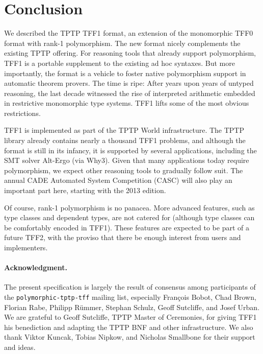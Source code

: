 \section{Conclusion}
\label{sec_concl}

We described the TPTP TFF1 format, an extension of the monomorphic TFF0 format
with rank-1 polymorphism. The new format nicely complements the existing TPTP
offering. %
For reasoning tools that already
support polymorphism, TFF1 is a portable supplement to the existing ad hoc
syntaxes. But more importantly, the format is a vehicle to foster native
polymorphism support in automatic theorem provers. The time is ripe: After years
upon years of untyped reasoning, the last decade witnessed the rise of
interpreted arithmetic embedded in restrictive monomorphic type systems. TFF1
lifts some of the most obvious restrictions.

TFF1 is implemented as part of the TPTP World infrastructure. The TPTP library
already contains nearly a thousand TFF1 problems, and although the format is
still in its infancy, it is supported by several applications, including the SMT
solver Alt-Ergo (via Why3). Given that many applications today require
polymorphism, we expect other reasoning tools to gradually follow suit. The
annual CADE Automated System Competition (CASC) will also play an important
part here, starting with the 2013 edition.

Of course, rank-1 polymorphism is no panacea. More advanced features, such as
type classes and dependent types, are not catered for (although type
classes can be comfortably encoded in TFF1). These features are expected to be
part of a future TFF2, with the proviso that there be enough interest from users
and implementers.

\def\ackname{Acknowledgment}
\paragraph{\textbf{\upshape\ackname.}}
%
The present specification is largely the result of consensus among
participants of the {\tt polymorphic-tptp-tff} mailing list, especially
Fran\c{c}ois Bobot, Chad Brown, Florian Rabe, Philipp R\"ummer, Stephan Schulz,
Geoff Sutcliffe, and Josef Urban.
We are grateful to Geoff Sutcliffe, TPTP Master of Ceremonies, for giving TFF1
his benediction and adapting the TPTP BNF and other infrastructure.
We also thank Viktor Kuncak, Tobias Nipkow, and Nicholas Smallbone for their
support and ideas.
